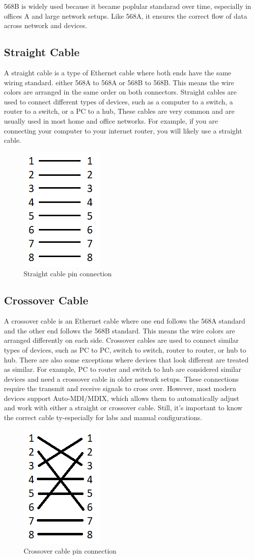 \documentclass[a4paper,12pt]{report}
\begin{document}
568B is widely used because it became poplular standarad over time, especially in offices A and large network setups. Like 568A, it ensures the correct flow of data across network and devices. 
\newpage
\subsection*{Straight Cable}
A straight cable is a type of Ethernet cable where both ends have the same wiring standard. either 568A to 568A or 568B to 568B. This means the wire colors are arranged in the same order on both connectors. Straight cables are used to connect different types of devices, such as a computer to a switch, a router to a switch, or a PC to a hub, These cables are very common and are usually used in most home and office networks. For example, if you are connecting your computer to your internet router, you will likely use a straight cable.
\begin{figure}[h]
    \centering
    \includegraphics[width=0.2\linewidth]{straight-cable.png}
    \caption{Straight cable pin connection}
\end{figure}
\subsection*{Crossover Cable}
A crossover cable is an Ethernet cable where one end follows the 568A standard and the other end follows the 568B standard. This means the wire colors are arranged differently on each side. Crossover cables are used to connect similar types of devices, such as PC to PC, switch to switch, router to router, or hub to hub. There are also some exceptions where devices that look different are treated as similar. For example, PC to router and switch to hub are considered similar devices and need a crossover cable in older network setups. These connections require the transmit and receive signals to cross over. However, most modern devices support Auto-MDI/MDIX, which allows them to automatically adjust and work with either a straight or crossover cable. Still, it's important to know the correct cable ty-especially for labs and manual configurations.
\begin{figure}[h]
    \centering
    \includegraphics[width=0.2\linewidth]{crossover_cable.png}
    \caption{Crossover cable pin connection}
\end{figure}
\newpage
\end{document}
